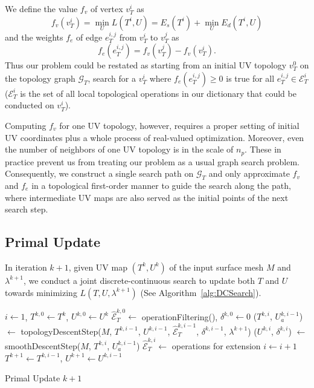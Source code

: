 We define the value $f_v$ of vertex $v^i_T$ as 
\[ f_v(v^i_T) = \min_{U} L(T^i, U) = E_s(T^i) + \min_{U} E_d(T^i, U) \]
and the weights $f_e$ of edge $e^{i,j}_{T}$ from $v^i_T$ to $v^j_T$ as 
\[ f_e(e^{i,j}_T) = f_v(v^j_T) - f_v(v^i_T). \]
Thus our problem could be restated as starting from an initial UV topology $v^0_T$ on the topology graph $\mathcal{G}_T$, search for a $v^i_T$ where $f_e(e^{i,j}_T) \geq 0$ is true for all $e^{i,j}_T \in \mathcal{E}^i_T$ ($\mathcal{E}^i_T$ is the set of all local topological operations in our dictionary that could be conducted on $v^i_T$).

Computing $f_v$ for one UV topology, however, requires a proper setting of initial UV coordinates plus a whole process of real-valued optimization. Moreover, even the number of neighbors of one UV topology is in the scale of $n_p$. These in practice prevent us from treating our problem as a usual graph search problem. Consequently, we construct a single search path on $\mathcal{G}_T$ and only approximate $f_v$ and $f_e$ in a topological first-order manner to guide the search along the path, where intermediate UV maps are also served as the initial points of the next search step.

\subsection{Primal Update}

In iteration $k+1$, given UV map $(T^{k}, U^{k})$ of the input surface mesh $M$ and $\lambda^{k+1}$, we conduct a joint discrete-continuous search to update both $T$ and $U$ towards minimizing $L(T,U,\lambda^{k+1})$ (See Algorithm~\ref{alg:DCSearch}).

\begin{algorithm}[h]
\SetAlgoLined
{}
$i \leftarrow 1$, $T^{k,0} \leftarrow T^{k}$, $U^{k,0} \leftarrow U^{k}$\;
$\hat{\mathcal{E}}^{k,0}_T \leftarrow$ operationFiltering(), $\delta^{k,0} \leftarrow 0$\;
{
	($T^{k,i}$, $U_a^{k,i-1}$) $\leftarrow$ topologyDescentStep($M$, $T^{k,i-1}$, $U^{k,i-1}$, $\hat{\mathcal{E}}^{k,i-1}_T$, $\delta^{k,i-1}$, $\lambda^{k+1}$)\;
	($U^{k,i}$, $\delta^{k,i}$) $\leftarrow$ smoothDescentStep($M$, $T^{k,i}$, $U_a^{k,i-1}$)\;
	$\hat{\mathcal{E}}^{k,i}_T \leftarrow$ operations for extension\;
	$i \leftarrow i+1$\;
}
$T^{k+1} \leftarrow T^{k,i-1}$, $U^{k+1} \leftarrow U^{k,i-1}$
\caption{Primal Update $k+1$}
\label{alg:DCSearch}
\end{algorithm}


